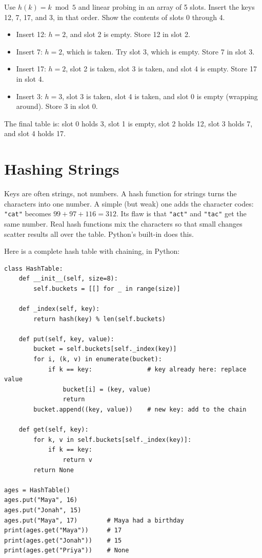 \begin{Exercise}[title={Linear Probing}, label=hash2]
Use $h(k) = k \bmod 5$ and linear probing in an array of 5 slots. Insert the keys 12, 7, 17, and 3, in that order. Show the contents of slots 0 through 4.
\end{Exercise}
\begin{Answer}[ref=hash2]
\begin{itemize}
    \item Insert 12: $h = 2$, and slot 2 is empty. Store 12 in slot 2.
    \item Insert 7: $h = 2$, which is taken. Try slot 3, which is empty. Store 7 in slot 3.
    \item Insert 17: $h = 2$, slot 2 is taken, slot 3 is taken, and slot 4 is empty. Store 17 in slot 4.
    \item Insert 3: $h = 3$, slot 3 is taken, slot 4 is taken, and slot 0 is empty (wrapping around). Store 3 in slot 0.
\end{itemize}
The final table is: slot 0 holds 3, slot 1 is empty, slot 2 holds 12, slot 3 holds 7, and slot 4 holds 17.
\end{Answer}

\section{Hashing Strings}

Keys are often strings, not numbers. A hash function for strings turns
the characters into one number. A simple (but weak) one adds the
character codes: \texttt{"cat"} becomes $99 + 97 + 116 = 312$. Its flaw
is that \texttt{"act"} and \texttt{"tac"} get the same number. Real hash
functions mix the characters so that small changes scatter results all
over the table. Python's built-in  does this.

Here is a complete hash table with chaining, in Python:

\begin{verbatim}
class HashTable:
    def __init__(self, size=8):
        self.buckets = [[] for _ in range(size)]

    def _index(self, key):
        return hash(key) % len(self.buckets)

    def put(self, key, value):
        bucket = self.buckets[self._index(key)]
        for i, (k, v) in enumerate(bucket):
            if k == key:               # key already here: replace value
                bucket[i] = (key, value)
                return
        bucket.append((key, value))    # new key: add to the chain

    def get(self, key):
        for k, v in self.buckets[self._index(key)]:
            if k == key:
                return v
        return None

ages = HashTable()
ages.put("Maya", 16)
ages.put("Jonah", 15)
ages.put("Maya", 17)        # Maya had a birthday
print(ages.get("Maya"))     # 17
print(ages.get("Jonah"))    # 15
print(ages.get("Priya"))    # None
\end{verbatim}

